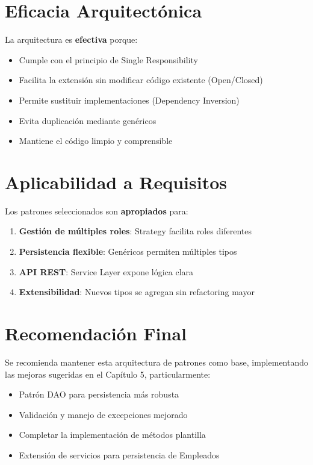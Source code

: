 \documentclass[12pt, a4paper]{report}
\begin{document}
\section{Eficacia Arquitectónica}

La arquitectura es \textbf{efectiva} porque:

\begin{itemize}
    \item Cumple con el principio de Single Responsibility
    \item Facilita la extensión sin modificar código existente (Open/Closed)
    \item Permite sustituir implementaciones (Dependency Inversion)
    \item Evita duplicación mediante genéricos
    \item Mantiene el código limpio y comprensible
\end{itemize}

\section{Aplicabilidad a Requisitos}

Los patrones seleccionados son \textbf{apropiados} para:

\begin{enumerate}
    \item \textbf{Gestión de múltiples roles}: Strategy facilita roles diferentes
    \item \textbf{Persistencia flexible}: Genéricos permiten múltiples tipos
    \item \textbf{API REST}: Service Layer expone lógica clara
    \item \textbf{Extensibilidad}: Nuevos tipos se agregan sin refactoring mayor
\end{enumerate}

\section{Recomendación Final}

Se recomienda mantener esta arquitectura de patrones como base, implementando las mejoras sugeridas en el Capítulo 5, particularmente:

\begin{itemize}
    \item Patrón DAO para persistencia más robusta
    \item Validación y manejo de excepciones mejorado
    \item Completar la implementación de métodos plantilla
    \item Extensión de servicios para persistencia de Empleados
\end{itemize}
\end{document}
